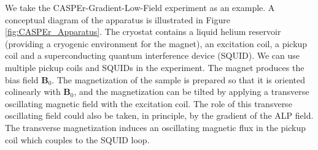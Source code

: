 \documentclass{WileyMSP-template}
\newcommand{\DK}[1]{\textcolor{brown}{Derek: #1}}
\newcommand{\AW}[1]{\textcolor{cyan}{Arne: #1}}
\begin{document}
	We take the CASPEr-Gradient-Low-Field experiment as an example. 
	A conceptual diagram of the apparatus is illustrated in Figure\,\ref{fig:CASPEr_Apparatus}. 
	The cryostat contains a liquid helium reservoir (providing a cryogenic environment for the magnet), an excitation coil, a pickup coil and a superconducting quantum interference device (SQUID). We can use multiple pickup coils and SQUIDs in the experiment. The magnet produces the bias field $\mathbf{B}_0$. The magnetization of the sample is prepared so that it is oriented colinearly with $\mathbf{B}_0$, and the magnetization can be tilted by applying a transverse oscillating magnetic field with the excitation coil. The role of this transverse oscillating field could also be taken, in principle, by the gradient of the ALP field.
	The transverse magnetization induces an oscillating magnetic flux in the pickup coil which couples to the SQUID loop. 
\end{document}
